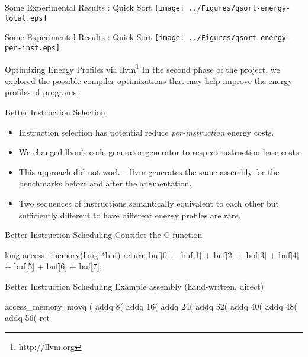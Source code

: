 \documentclass[xcolor=dvipsnames]{beamer}
\begin{document}
\begin{frame}{Some Experimental Results : Quick Sort}
  \texttt{[image: ../Figures/qsort-energy-total.eps]}
\end{frame}

\begin{frame}{Some Experimental Results : Quick Sort}
  \texttt{[image: ../Figures/qsort-energy-per-inst.eps]}
\end{frame}


\begin{frame}{Optimizing Energy Profiles via llvm\footnote{http://llvm.org}}
  In the second phase of the project, we explored the possible
  compiler optimizations that may help improve the energy profiles of
  programs.
\end{frame}

\begin{frame}{Better Instruction Selection}
  \begin{itemize}
    \item Instruction selection has potential reduce
      \textit{per-instruction} energy costs.
    \item We changed llvm's code-generator-generator to respect
      instruction base costs.  \pause
    \item This approach did not work -- llvm generates the same
      assembly for the benchmarks before and after the augmentation.
    \item Two sequences of instructions semantically equivalent to
      each other but sufficiently different to have different energy
      profiles are rare.
  \end{itemize}
\end{frame}

\begin{frame}[fragile]{Better Instruction Scheduling}
  Consider the C function

  \begin{ccode}
    long access_memory(long *buf) {
      return buf[0] + buf[1] + buf[2] + buf[3] +
             buf[4] + buf[5] + buf[6] + buf[7];
    }
  \end{ccode}
\end{frame}

\begin{frame}[fragile]{Better Instruction Scheduling}
  Example assembly (hand-written, direct)

  \begin{gascode}
    access_memory:
      movq    (%
      addq    8(%
      addq    16(%
      addq    24(%
      addq    32(%
      addq    40(%
      addq    48(%
      addq    56(%
      ret
  \end{gascode}
\end{frame}
\end{document}
